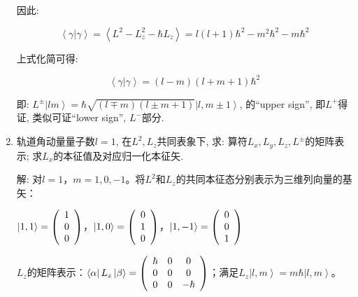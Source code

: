 \begin{enumerate}
因此:

\begin{equation*}
\left\langle \gamma | \gamma \right\rangle = \left\langle L^2 -
L_z^2 - \hbar L_z \right\rangle = l(l+1)\hbar^2 - m^2\hbar^2 -m
\hbar^2
\end{equation*}

上式化简可得:

\begin{equation*}
\left\langle \gamma | \gamma \right\rangle =  (l - m)(l+m+1)\hbar^2
\end{equation*}

即: $L^{\pm} \left| lm \right\rangle = \hbar \sqrt{(l \mp m)(l \pm m
+1) } \left|l, m \pm 1 \right\rangle$, 的``upper sign'',
即$L^+$得证, 类似可证``lower sign'', $L^-$部分.


\item 轨道角动量量子数$l=1$, 在$L^2, L_z$共同表象下, 求: 算符$L_x, L_y, L_z, L^{\pm}$的矩阵表示; 求$L_x$的本征值及对应归一化本征矢.

解:
对$l=1$，$m=1,0,-1$。将$L^2$和$L_z$的共同本征态分别表示为三维列向量的基矢：

$\left|1,1 \right\rangle=\left( {\begin{array}{*{20}c}
   1  \\
   0  \\
   0  \\
 \end{array} } \right)$，$\left|1,0 \right\rangle =\left( {\begin{array}{*{20}c}
   0  \\
   1  \\
   0  \\
 \end{array} } \right)$，$\left|1,-1 \right\rangle =\left( {\begin{array}{*{20}c}
   0  \\
   0  \\
   1  \\
 \end{array} } \right)$

$L_z$的矩阵表示：$\left\langle \alpha  \right|L_z \left| \beta
\right\rangle  = \left( {\begin{array}{*{20}c}
   \hbar  & 0 & 0  \\
   0 & 0 & 0  \\
   0 & 0 & { - \hbar }  \\
\end{array}} \right)$；满足$L_z \left| l,m \right> = m \hbar
\left| l,m \right>$。


\end{enumerate}
